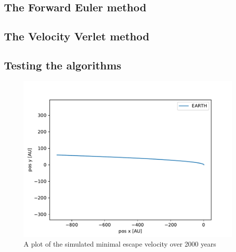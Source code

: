 \documentclass[a4paper]{article}
\begin{document}
\subsection{The Forward Euler method}

\subsection{The Velocity Verlet method}

\subsection{Testing the algorithms}

\begin{figure}[h!]
	\centering 
	\includegraphics[scale=0.7]{escapeVelocity2000.pdf}
	\caption{A plot of the simulated minimal escape velocity over 2000 years}
	\label{escape_vel}
\end{figure}
\end{document}
